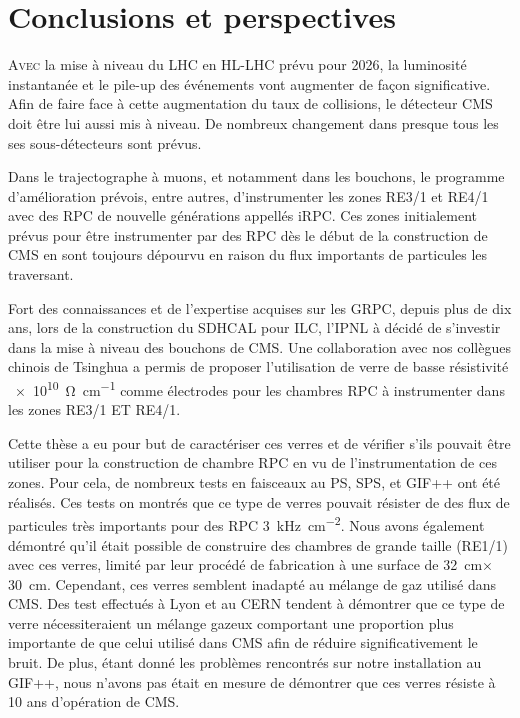 \chapter{Conclusions et perspectives}
\renewcommand\chapterillustration{CON/CON}
\ThisULCornerWallPaper{1}{\chapterillustration}
\vspace*{-0.5cm}
\lettrine[lines=4, slope=-0.5em,nindent=10pt]{A}{vec} la mise à niveau du LHC en HL-LHC prévu pour 2026, la luminosité instantanée et le pile-up des événements vont augmenter de façon significative. Afin de faire face à cette augmentation du taux de collisions, le détecteur CMS doit être lui aussi mis à niveau. De nombreux changement dans presque tous les ses sous-détecteurs sont prévus.

Dans le trajectographe à muons, et notamment dans les bouchons, le programme d'amélioration prévois, entre autres, d'instrumenter les zones RE3/1 et RE4/1 avec des RPC de nouvelle générations appellés iRPC. Ces zones initialement prévus pour être instrumenter par des RPC dès le début de la construction de CMS en sont toujours dépourvu en raison du flux importants de particules les traversant.

Fort des connaissances et de l'expertise acquises sur les GRPC, depuis plus de dix ans, lors de la construction du SDHCAL pour ILC, l'IPNL à décidé de s'investir dans la mise à niveau des bouchons de CMS. Une collaboration avec nos collègues chinois de Tsinghua a permis de proposer l'utilisation de verre de basse résistivité \SI{e10}{\ohm\per\centi\meter} comme électrodes pour les chambres RPC à instrumenter dans les zones RE3/1 ET RE4/1. 

Cette thèse a eu pour but de caractériser ces verres et de vérifier s'ils pouvait être utiliser pour la construction de chambre RPC en vu de l'instrumentation de ces zones. Pour cela, de nombreux tests en faisceaux au PS, SPS, et GIF++ ont été réalisés. Ces tests on montrés que ce type de verres pouvait résister de des flux de particules très importants pour des RPC \SI{3}{\kilo\hertz\per\square\centi\meter}. Nous avons également démontré qu'il était possible de construire des chambres de grande taille (RE1/1) avec ces verres, limité par leur procédé de fabrication à une surface de \SI{32}{\centi\meter}$\times$\SI{30}{\centi\meter}. Cependant, ces verres semblent inadapté au mélange de gaz utilisé dans CMS. Des test effectués à Lyon et au CERN tendent à démontrer que ce type de verre nécessiteraient un mélange gazeux comportant une proportion plus importante de  que celui utilisé dans CMS afin de réduire significativement le bruit. De plus, étant donné les problèmes rencontrés sur notre installation au GIF++, nous n'avons pas était en mesure de démontrer que ces verres résiste à \num{10} ans d'opération de CMS.

